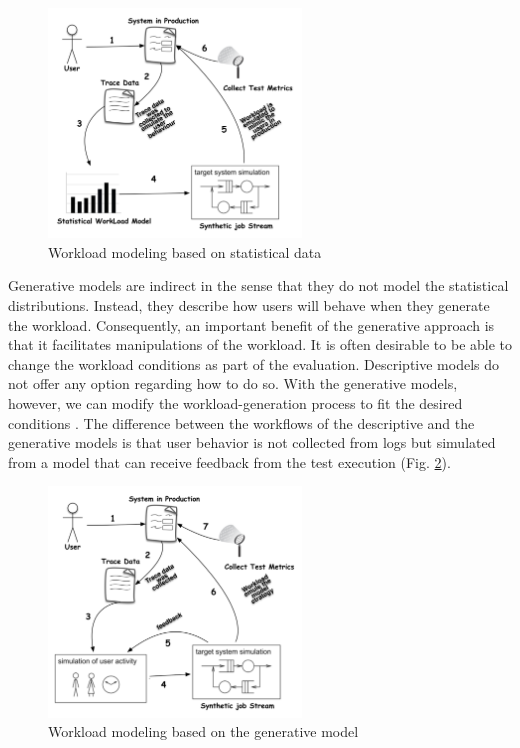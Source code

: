 \documentclass[espaco=umemeio,chapter=TITLE,twoside,openright]{abnt}
\begin{document}
\begin{figure}[!ht]

\centering
\includegraphics[width=0.6\textwidth]{./images/workloadmodel1300dpi.png}
\caption{Workload modeling based on statistical data \cite{DiLucca2006}}
\label{fig:descriptivemodel}
\end{figure}


Generative models are indirect in the sense that they do not model the statistical distributions. Instead, they describe how users will behave when they generate the workload. Consequently, an important benefit of the generative approach is that it facilitates manipulations of the workload. It is often desirable to be able to change the workload conditions as part of the evaluation. Descriptive models do not offer any option regarding how to do so. With the generative models, however, we can modify the workload-generation process to fit the desired conditions \cite{Feitelson2013}. The difference between the workflows of the descriptive and the generative models is that user behavior is not collected from logs but simulated from a model that can receive feedback from the test execution (Fig. \ref{fig:generativemodel}).


\begin{figure}[h]
\centering
\includegraphics[width=0.6\textwidth]{./images/workloadmodel2300dpi.png}
\caption{Workload modeling based on the generative model \cite{DiLucca2006}}
\label{fig:generativemodel}

\end{figure}
\end{document}
